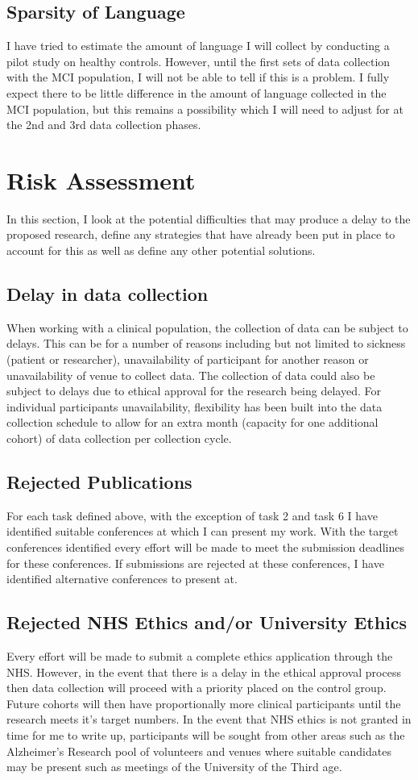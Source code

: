 \documentclass[10pt, letterpaper, twoside, openany]{book}
\begin{document}
\subsection{Sparsity of Language}
I have tried to estimate the amount of language I will collect by conducting a pilot study on healthy controls. However, until the first sets of data collection with the MCI population, I will not be able to tell if this is a problem. I fully expect there to be little difference in the amount of language collected in the MCI population, but this remains a possibility which I will need to adjust for at the 2nd and 3rd data collection phases. 

\section{Risk Assessment}
In this section, I look at the potential difficulties that may produce a delay to the proposed research, define any strategies that have already been put in place to account for this as well as define any other potential solutions.
\subsection{Delay in data collection}
When working with a clinical population, the collection of data can be subject to delays. This can be for a number of reasons including but not limited to sickness (patient or researcher), unavailability of participant for another reason or unavailability of venue to collect data. The collection of data could also be subject to delays due to ethical approval for the research being delayed. For individual participants unavailability, flexibility has been built into the data collection schedule to allow for an extra month (capacity for one additional cohort) of data collection per collection cycle. 
\subsection{Rejected Publications}
For each task defined above, with the exception of task 2 and task 6 I have identified suitable conferences at which I can present my work. With the target conferences identified every effort will be made to meet the submission deadlines for these conferences. If submissions are rejected at these conferences, I have identified alternative conferences to present at. 
\subsection{Rejected NHS Ethics and/or University Ethics}
Every effort will be made to submit a complete ethics application through the NHS. However, in the event that there is a delay in the ethical approval process then data collection will proceed with a priority placed on the control group. Future cohorts will then have proportionally more clinical participants until the research meets it's target numbers. In the event that NHS ethics is not granted in time for me to write up, participants will be sought from other areas such as the Alzheimer's Research pool of volunteers and venues where suitable candidates may be present such as meetings of the University of the Third age.   
\end{document}
